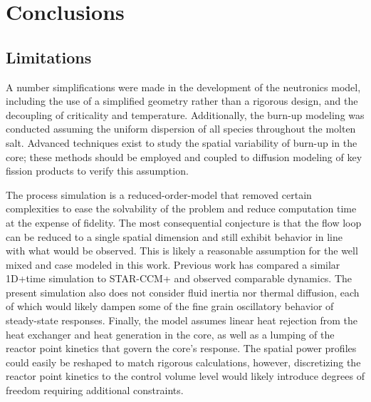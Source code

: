 \chapter{Conclusions}
\label{Chapter:Conclusions}

\section{Limitations}
A number simplifications were made in the development of the neutronics model, including the use of a simplified geometry rather than a rigorous design, and the decoupling of criticality and temperature. Additionally, the burn-up modeling was conducted assuming the uniform dispersion of all species throughout the molten salt. Advanced techniques exist to study the spatial variability of burn-up in the core; these methods should be employed and coupled to diffusion modeling of key fission products to verify this assumption. 

The process simulation is a reduced-order-model that removed certain complexities to ease the solvability of the problem and reduce computation time at the expense of fidelity. The most consequential conjecture is that the flow loop can be reduced to a single spatial dimension and still exhibit behavior in line with what would be observed. This is likely a reasonable assumption for the well mixed and case modeled in this work. Previous work has compared a similar 1D+time simulation to STAR-CCM+ and observed comparable dynamics. The present simulation also does not consider fluid inertia nor thermal diffusion, each of which would likely dampen some of the fine grain oscillatory behavior of steady-state responses. Finally, the model assumes linear heat rejection from the heat exchanger and heat generation in the core, as well as a lumping of the reactor point kinetics that govern the core's response. The spatial power profiles could easily be reshaped to match rigorous calculations, however, discretizing the reactor point kinetics to the control volume level would likely introduce degrees of freedom requiring additional constraints.

